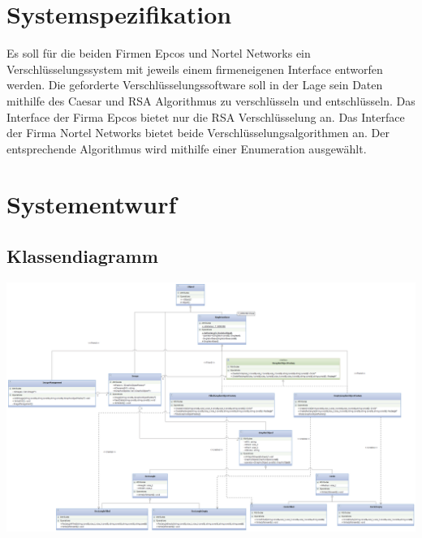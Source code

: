 \documentclass[12pt,a4paper]{article}
\begin{document}
\section{Systemspezifikation}

Es soll für die beiden Firmen Epcos und Nortel Networks ein Verschlüsselungssystem mit jeweils einem firmeneigenen Interface entworfen werden. Die geforderte Verschlüsselungssoftware soll in der Lage sein Daten mithilfe des Caesar und RSA Algorithmus zu verschlüsseln und entschlüsseln.
\newline
Das Interface der Firma Epcos bietet nur die RSA Verschlüsselung an.
\newline
Das Interface der Firma Nortel Networks bietet beide Verschlüsselungsalgorithmen an. Der entsprechende Algorithmus wird mithilfe einer Enumeration ausgewählt.
\\


\newpage
\section {Systementwurf}

\subsection {Klassendiagramm}

\includegraphics[angle=90,scale=0.6] {../Klassendiagramm.png}

\newpage
\end{document}
